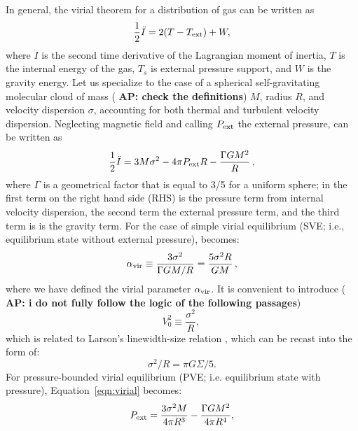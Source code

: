\IfFileExists{emulateapjlegacy.cls}{\documentclass[iop]{emulateapjlegacy}}{\documentclass[iop]{emulateapj}}
\newcommand{\AP}[1]{({\bf \color{apcolor} AP: #1})}
\begin{document}
In general, the virial theorem for a distribution of gas can be written as
\begin{equation}\label{eqn:virial_th_general}
\frac{1}{2}\ddot I = 2(T - T_{\rm ext}) + W,
\end{equation}
where $\ddot I$ is the second time derivative of the Lagrangian moment of inertia, $T$ is the internal energy of the gas, $T_s$ is external pressure support, and $W$ is the gravity energy.
%
Let us specialize to the case of a spherical self-gravitating molecular cloud of mass \AP{check the definitions} $M$, radius $R$, and velocity dispersion $\sigma$, accounting for both thermal and turbulent velocity dispersion. Neglecting magnetic field and calling $P_{\rm ext}$ the external pressure,  can be written as
\begin{equation}
\frac{1}{2}\ddot I = 3 M \sigma^2 - 4\pi P_{\rm ext} R - \frac{\Gamma GM^2}{R}\,,
\label{eqn:virial}
\end{equation}
where $\Gamma$ is a geometrical factor that is equal to 3/5 for a uniform sphere; in  the first term on the right hand side (RHS) is the pressure term from internal velocity dispersion, the second term the external pressure term, and the third term is is the gravity term. For the case of simple virial equilibrium (SVE; i.e., equilibrium state without external pressure),  becomes:
\begin{equation}
\alpha_{\rm vir} \equiv \frac{3\sigma^2}{\Gamma GM/R} = \frac{5\sigma^2R}{GM}\,,
\label{eqn:alpha}
\end{equation}
where we have defined the virial parameter $\alpha_{\rm vir}$. It is convenient to introduce \AP{i do not fully follow the logic of the following passages}
\begin{equation}
V_0^2\equiv\frac{\sigma^2}{R},\,
\end{equation}
which is related to Larson's linewidth-size relation \citep{Larson81a}, which can be recast into the form of:
\begin{equation}
\sigma^2/R = \pi G \Sigma/5.
\end{equation}
For pressure-bounded virial equilibrium (PVE; i.e. equilibrium state with pressure), %
Equation~\ref{eqn:virial} becomes:
\begin{equation}
P_{\rm ext} = \frac{3\sigma^2M}{4\pi R^3} - \frac{\Gamma G M^2}{4\pi R^4},
\label{eqn:pext}
\end{equation}
\end{document}

